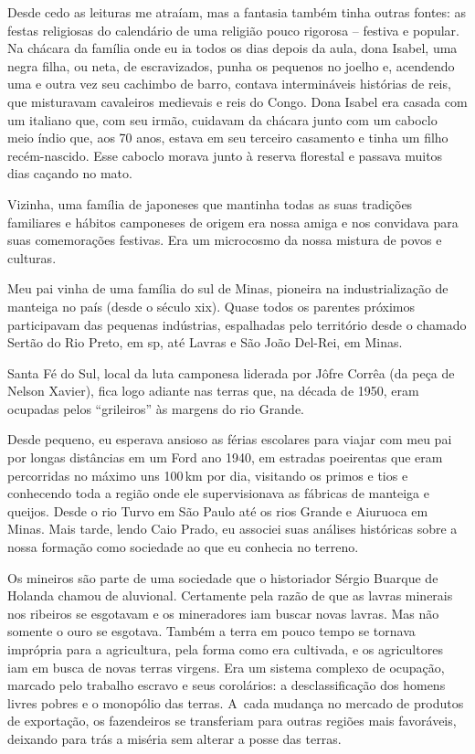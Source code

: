 Desde cedo as leituras me atraíam, mas a fantasia também tinha outras
fontes: as festas religiosas do calendário de uma religião pouco
rigorosa -- festiva e popular. Na chácara da família onde eu ia todos os
dias depois da aula, dona Isabel, uma negra filha, ou neta, de escravizados,
punha os pequenos no joelho e, acendendo uma e outra vez seu cachimbo de
barro, contava intermináveis histórias de reis, que misturavam
cavaleiros medievais e reis do Congo. Dona Isabel era casada com um
italiano que, com seu irmão, cuidavam da chácara junto com um caboclo meio
índio que, aos 70 anos, estava em seu terceiro casamento e tinha um filho
recém-nascido. Esse caboclo morava junto à reserva florestal e passava
muitos dias caçando no mato.

Vizinha, uma família de japoneses que mantinha todas as suas tradições
familiares e hábitos camponeses de origem era nossa amiga e nos
convidava para suas comemorações festivas. Era um microcosmo da nossa
mistura de povos e culturas.

Meu pai vinha de uma família do sul de Minas, pioneira na
industrialização de manteiga no país (desde o século {\sc xix}). Quase todos
os parentes próximos participavam das pequenas indústrias,
espalhadas pelo território desde o chamado Sertão do Rio Preto, em {\sc sp}, até
Lavras e São João Del-Rei, em Minas.

Santa Fé do Sul, local da luta camponesa liderada por Jôfre Corrêa (da
peça de Nelson Xavier), fica logo adiante nas terras que, na década de
1950, eram ocupadas pelos “grileiros” às margens do rio Grande.

Desde pequeno, eu esperava ansioso as férias escolares para viajar com
meu pai por longas distâncias em um Ford ano 1940, em estradas poeirentas
que eram percorridas no máximo uns 100\,km por dia, visitando os primos e
tios e conhecendo toda a região onde ele supervisionava as fábricas de
manteiga e queijos. Desde o rio Turvo em São Paulo até os rios Grande e
Aiuruoca em Minas. Mais tarde, lendo Caio Prado, eu associei suas análises
históricas sobre a nossa formação como sociedade ao que eu conhecia no
terreno.

Os mineiros são parte de uma sociedade que o historiador Sérgio Buarque
de Holanda chamou de aluvional. Certamente pela razão de que as lavras
minerais nos ribeiros se esgotavam e os mineradores iam buscar novas
lavras. Mas não somente o ouro se esgotava. Também a terra em pouco
tempo se tornava imprópria para a agricultura, pela forma como era
cultivada, e os agricultores iam em busca de novas terras virgens. Era um
sistema complexo de ocupação, marcado pelo trabalho escravo e seus
corolários: a desclassificação dos homens livres pobres e o monopólio das
terras. A~cada mudança no mercado de produtos de exportação, os
fazendeiros se transferiam para outras regiões mais favoráveis, deixando
para trás a miséria sem alterar a posse das terras.

